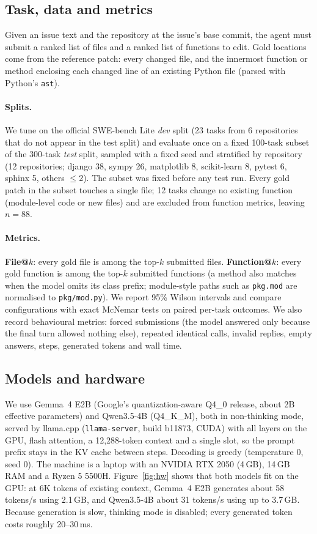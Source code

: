 \documentclass[11pt]{article}
\newcommand{\Gm}{Gemma~4 E2B}
\newcommand{\Qw}{Qwen3.5-4B}
\begin{document}
\subsection{Task, data and metrics}
Given an issue text and the repository at the issue's base commit, the agent must submit a ranked list of files and a ranked list of functions to edit.
Gold locations come from the reference patch: every changed file, and the innermost function or method enclosing each changed line of an existing Python file (parsed with Python's \texttt{ast}).

\paragraph{Splits.} We tune on the official SWE-bench Lite \emph{dev} split (23 tasks from 6 repositories that do not appear in the test split) and evaluate once on a fixed 100-task subset of the 300-task \emph{test} split, sampled with a fixed seed and stratified by repository (12 repositories; django 38, sympy 26, matplotlib 8, scikit-learn 8, pytest 6, sphinx 5, others $\le$2).
The subset was fixed before any test run.
Every gold patch in the subset touches a single file; 12 tasks change no existing function (module-level code or new files) and are excluded from function metrics, leaving $n=88$.

\paragraph{Metrics.} \textbf{File@$k$}: every gold file is among the top-$k$ submitted files. \textbf{Function@$k$}: every gold function is among the top-$k$ submitted functions (a method also matches when the model omits its class prefix; module-style paths such as \texttt{pkg.mod} are normalised to \texttt{pkg/mod.py}). We report 95\% Wilson intervals and compare configurations with exact McNemar tests on paired per-task outcomes. We also record behavioural metrics: forced submissions (the model answered only because the final turn allowed nothing else), repeated identical calls, invalid replies, empty answers, steps, generated tokens and wall time.

\subsection{Models and hardware}
\label{sec:hardware}
We use \Gm{} (Google's quantization-aware Q4\_0 release, about 2B effective parameters) and \Qw{} (Q4\_K\_M), both in non-thinking mode, served by llama.cpp (\texttt{llama-server}, build b11873, CUDA) with all layers on the GPU, flash attention, a 12{,}288-token context and a single slot, so the prompt prefix stays in the KV cache between steps.
Decoding is greedy (temperature 0, seed 0).
The machine is a laptop with an NVIDIA RTX 2050 (4\,GB), 14\,GB RAM and a Ryzen 5 5500H.
Figure~\ref{fig:hw} shows that both models fit on the GPU: at 6K tokens of existing context, \Gm{} generates about 58 tokens/s using 2.1\,GB, and \Qw{} about 31 tokens/s using up to 3.7\,GB.
Because generation is slow, thinking mode is disabled; every generated token costs roughly 20--30\,ms.
\end{document}
